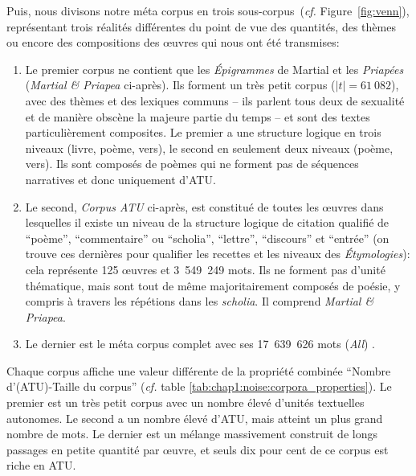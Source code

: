 Puis, nous divisons notre méta corpus en trois sous-corpus~(\textit{cf.} Figure~\ref{fig:venn}), représentant trois réalités différentes du point de vue des quantités, des thèmes ou encore des compositions des œuvres qui nous ont été transmises:
\begin{enumerate}
    \item Le premier corpus ne contient que les \textit{Épigrammes} de Martial et les \textit{Priapées} (\textit{Martial \& Priapea} ci-après). Ils forment un très petit corpus ($\left | t \right |=61~082$), avec des thèmes et des lexiques communs -- ils parlent tous deux de sexualité et de manière obscène la majeure partie du temps -- et sont des textes particulièrement composites. Le premier a une structure logique en trois niveaux (livre, poème, vers), le second en seulement deux niveaux (poème, vers). Ils sont composés de poèmes qui ne forment pas de séquences narratives et donc uniquement d'ATU.
    \item Le second, \textit{Corpus ATU} ci-après, est constitué de toutes les œuvres dans lesquelles il existe un niveau de la structure logique de citation qualifié de ``poème'', ``commentaire'' ou ``scholia'', ``lettre'', ``discours'' et ``entrée'' (on trouve ces dernières pour qualifier les recettes et les niveaux des \textit{Étymologies}): cela représente 125 œuvres et 3~549~249 mots. Ils ne forment pas d'unité thématique, mais sont tout de même majoritairement composés de poésie, y compris à travers les répétions dans les \textit{scholia}. Il comprend \textit{Martial \& Priapea}.
    \item Le dernier est le méta corpus complet avec ses 17~639~626 mots (\textit{All}) .
\end{enumerate}

Chaque corpus affiche une valeur différente de la propriété combinée ``Nombre d'(ATU)-Taille du corpus'' (\textit{cf.} table \ref{tab:chap1:noise:corpora_properties}). Le premier est un très petit corpus avec un nombre élevé d'unités textuelles autonomes. Le second a un nombre élevé d'ATU, mais atteint un plus grand nombre de mots. Le dernier est un mélange massivement construit de longs passages en petite quantité par œuvre, et seuls dix pour cent de ce corpus est riche en ATU.

